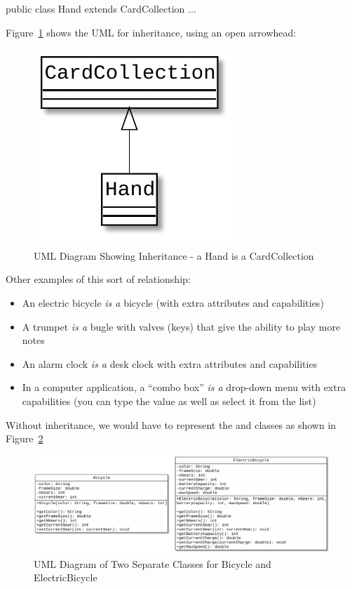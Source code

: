 \begin{code}
public class Hand extends CardCollection {
   ...
}
\end{code}

Figure~\ref{fig.simpleInheritance} shows the UML for inheritance, using an open arrowhead:

\begin{figure}[!ht]
\begin{center}
\includegraphics[scale=0.75]{figs/ch14/inheritance.pdf}
\caption{UML Diagram Showing Inheritance - a Hand is a CardCollection}
\label{fig.simpleInheritance}
\end{center}
\end{figure}

Other examples of this sort of relationship:

\begin{itemize}
\item An electric bicycle {\em is a} bicycle (with extra attributes and capabilities)
\item A trumpet {\em is a} bugle with valves (keys) that give the ability to play more notes
\item An alarm clock {\em is a} desk clock with extra attributes and capabilities
\item In a computer application, a ``combo box'' {\em is a} drop-down menu with extra capabilities (you can type the value as well as select it from the list)
\end{itemize}

Without inheritance, we would have to represent the  and  classes as shown in Figure~\ref{fig.nonInheritedBikes}

\begin{figure}[!ht]
\begin{center}
\includegraphics[scale=0.3]{figs/ch14/non_inherited_bikes.pdf}
\caption{UML Diagram of Two Separate Classes for Bicycle and ElectricBicycle}
\label{fig.nonInheritedBikes}
\end{center}
\end{figure}

